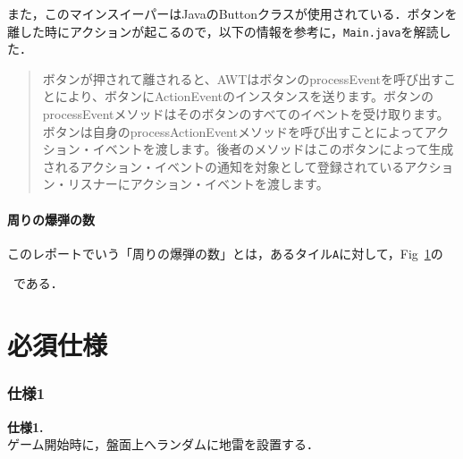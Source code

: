 \documentclass[a4j,11pt]{jsarticle}
\newcommand{\figref}[1]{Fig\ \ref{#1}}
\begin{document}
また，このマインスイーパーはJavaのButtonクラスが使用されている．ボタンを離した時にアクションが起こるので，以下の情報を参考に，\verb|Main.java|を解読した．
\begin{quote}
    ボタンが押されて離されると、AWTはボタンのprocessEventを呼び出すことにより、ボタンにActionEventのインスタンスを送ります。ボタンのprocessEventメソッドはそのボタンのすべてのイベントを受け取ります。ボタンは自身のprocessActionEventメソッドを呼び出すことによってアクション・イベントを渡します。後者のメソッドはこのボタンによって生成されるアクション・イベントの通知を対象として登録されているアクション・リスナーにアクション・イベントを渡します。\\\hfill{\cite{label1}}
\end{quote}
\subsection*{周りの爆弾の数}
このレポートでいう「周りの爆弾の数」とは，あるタイル\verb|A|に対して，\figref{fig:周りの爆弾}の\ \ である．
\begin{figure}[h]
    \centering
    \caption{}
    \label{fig:周りの爆弾}
\end{figure}
\newpage
\part{必須仕様}
\section*{仕様1}
\setcounter{section}{1}
\begin{screen}
    \textbf{仕様1.}\\
    ゲーム開始時に，盤面上へランダムに地雷を設置する．
\end{screen}
\end{document}

